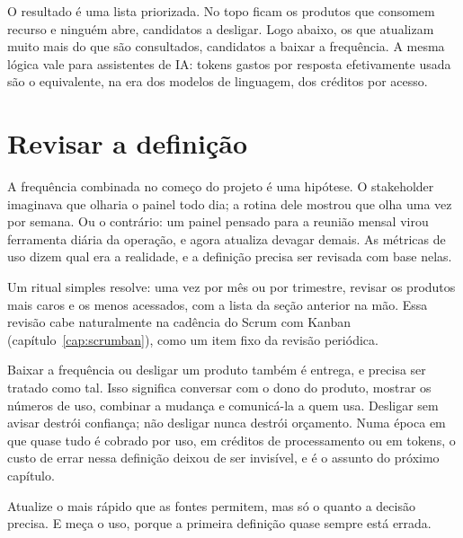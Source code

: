 O resultado é uma lista priorizada. No topo ficam os produtos que consomem recurso e ninguém
abre, candidatos a desligar. Logo abaixo, os que atualizam muito mais do que são consultados,
candidatos a baixar a frequência. A mesma lógica vale para assistentes de IA: tokens gastos por
resposta efetivamente usada são o equivalente, na era dos modelos de linguagem, dos créditos
por acesso.

\section{Revisar a definição}
\label{sec:revisar-frequencia}

A frequência combinada no começo do projeto é uma hipótese. O stakeholder imaginava que
olharia o painel todo dia; a rotina dele mostrou que olha uma vez por semana. Ou o contrário:
um painel pensado para a reunião mensal virou ferramenta diária da operação, e agora atualiza
devagar demais. As métricas de uso dizem qual era a realidade, e a definição precisa ser
revisada com base nelas.

Um ritual simples resolve: uma vez por mês ou por trimestre, revisar os produtos mais caros e
os menos acessados, com a lista da seção anterior na mão. Essa revisão cabe naturalmente na
cadência do Scrum com Kanban (capítulo~\ref{cap:scrumban}), como um item fixo da revisão
periódica.

Baixar a frequência ou desligar um produto também é entrega, e precisa ser tratado como tal.
Isso significa conversar com o dono do produto, mostrar os números de uso, combinar a mudança
e comunicá-la a quem usa. Desligar sem avisar destrói confiança; não desligar nunca destrói
orçamento. Numa época em que quase tudo é cobrado por uso, em créditos de processamento ou em
tokens, o custo de errar nessa definição deixou de ser invisível, e é o assunto do próximo
capítulo.

\begin{destaque}
Atualize o mais rápido que as fontes permitem, mas só o quanto a decisão precisa. E meça o
uso, porque a primeira definição quase sempre está errada.
\end{destaque}


\begin{leituras}
\end{leituras}
